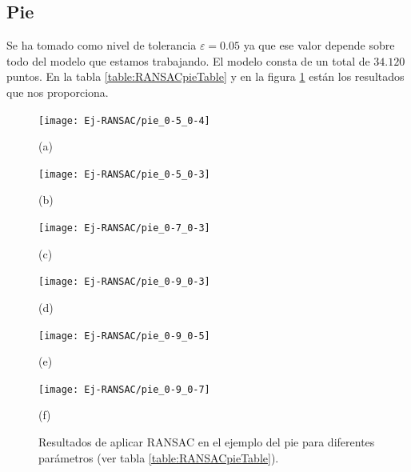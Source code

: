 \subsection{Pie}
Se ha tomado como nivel de tolerancia $ \varepsilon = 0.05 $ ya que ese valor depende sobre todo del modelo que estamos trabajando. El modelo consta de un total de $ 34.120 $ puntos. En la tabla \ref{table:RANSACpieTable} y en la figura \ref{fig:RANSACpie} están los resultados que nos proporciona. \\

\begin{figure}[h!]
	\begin{minipage}[b]{0.5\textwidth}
		\centering
		\texttt{[image: Ej-RANSAC/pie\_0-5\_0-4]} 
		\caption*{(a)}
	\end{minipage}
	\begin{minipage}[b]{0.5\textwidth}
		\centering
		\texttt{[image: Ej-RANSAC/pie\_0-5\_0-3]} 
		\caption*{(b)}
	\end{minipage}
	\begin{minipage}[b]{0.5\textwidth}
		\centering
		\texttt{[image: Ej-RANSAC/pie\_0-7\_0-3]} 
		\caption*{(c)}
	\end{minipage}
	\begin{minipage}[b]{0.5\textwidth}
		\centering
		\texttt{[image: Ej-RANSAC/pie\_0-9\_0-3]} 
		\caption*{(d)}
	\end{minipage}		
	\begin{minipage}[b]{0.5\textwidth}
		\centering
		\texttt{[image: Ej-RANSAC/pie\_0-9\_0-5]} 
		\caption*{(e)}
	\end{minipage}
	\begin{minipage}[b]{0.5\textwidth}
		\centering
		\texttt{[image: Ej-RANSAC/pie\_0-9\_0-7]} 
		\caption*{(f)}
	\end{minipage}	
	
	\caption{Resultados de aplicar RANSAC en el ejemplo del pie para diferentes parámetros (ver tabla \ref{table:RANSACpieTable}). }
	\label{fig:RANSACpie}
\end{figure}


